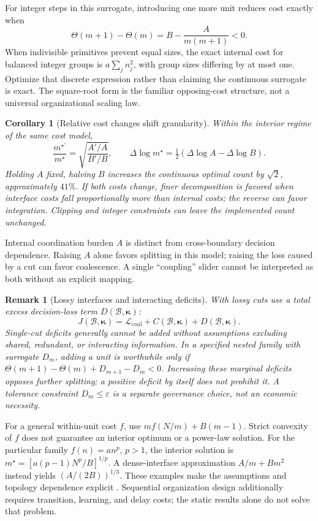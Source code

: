 \documentclass[11pt]{article}
\newtheorem{corollary}{Corollary}
\newtheorem{remark}{Remark}
\newcommand{\calB}{\mathcal{B}}
\begin{document}
For integer steps in this surrogate, introducing one more unit reduces cost
exactly when
\[
\Theta(m+1)-\Theta(m)=B-\frac{A}{m(m+1)}<0.
\]
When indivisible primitives prevent equal sizes, the exact internal cost for
balanced integer groups is $a\sum_j n_j^2$, with group sizes differing by at
most one. Optimize that discrete expression rather than claiming the
continuous surrogate is exact. The square-root form is the familiar
opposing-cost structure, not a universal organizational scaling law.

\begin{corollary}[Relative cost changes shift granularity]
\label{cor:agents}
Within the interior regime of the same cost model,
\[
\frac{m^{\star\prime}}{m^\star}
=\sqrt{\frac{A'/A}{B'/B}},\qquad
\Delta\log m^\star=\tfrac12(\Delta\log A-\Delta\log B).
\]
Holding $A$ fixed, halving $B$ increases the continuous optimal count by
$\sqrt2$, approximately $41\%$. If both costs change, finer decomposition is
favored when interface costs fall proportionally more than internal costs;
the reverse can favor integration. Clipping and integer constraints can leave
the implemented count unchanged.
\end{corollary}

Internal coordination burden $A$ is distinct from cross-boundary decision
dependence. Raising $A$ alone favors splitting in this model; raising the
loss caused by a cut can favor coalescence. A single ``coupling'' slider
cannot be interpreted as both without an explicit mapping.

\begin{remark}[Lossy interfaces and interacting deficits]
\label{cor:floor}
With lossy cuts use a total excess decision-loss term
$D(\calB,\boldsymbol\kappa)$:
\[
J(\calB,\boldsymbol\kappa)=\mathcal L_{\mathrm{coal}}
+C(\calB,\boldsymbol\kappa)+D(\calB,\boldsymbol\kappa).
\]
Single-cut deficits generally cannot be added without assumptions excluding
shared, redundant, or interacting information. In a specified nested family
with surrogate $D_m$, adding a unit is worthwhile only if
$\Theta(m+1)-\Theta(m)+D_{m+1}-D_m<0$. Increasing these marginal deficits
opposes further splitting; a positive deficit by itself does not prohibit it.
A tolerance constraint $D_m\leq\varepsilon$ is a separate governance choice,
not an economic necessity.
\end{remark}

For a general within-unit cost $f$, use
$m f(N/m)+B(m-1)$. Strict convexity of $f$ does not guarantee an interior
optimum or a power-law solution. For the particular family $f(n)=a n^p$,
$p>1$, the interior solution is
$m^\star=[a(p-1)N^p/B]^{1/p}$. A dense-interface approximation
$A/m+Bm^2$ instead yields $(A/(2B))^{1/3}$. These examples make the
assumptions and topology dependence explicit
\cite{parnas1972,baldwinclark2000}. Sequential organization design additionally
requires transition, learning, and delay costs; the static results alone do
not solve that problem.
\end{document}
